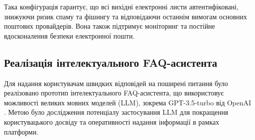 Така конфігурація гарантує, що всі вихідні електронні листи автентифіковані, знижуючи ризик спаму та фішингу та відповідаючи останнім вимогам основних поштових провайдерів. Вона також підтримує моніторинг та постійне вдосконалення безпеки електронної пошти.

\subsection{Реалізація інтелектуального FAQ-асистента}
\label{subsec:ai_faq_implementation}
Для надання користувачам швидких відповідей на поширені питання було реалізовано прототип інтелектуального FAQ-асистента, що використовує можливості великих мовних моделей (LLM), зокрема GPT-3.5-turbo від OpenAI \cite{openai_api}. Метою було дослідження потенціалу застосування LLM для покращення користувацького досвіду та оперативності надання інформації в рамках платформи.

